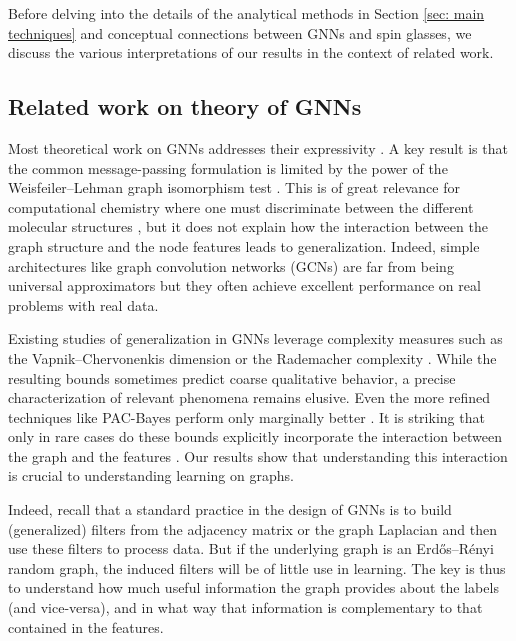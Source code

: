 \documentclass[9pt,twocolumn]{pnas-new}
\begin{document}
Before delving into the details of the analytical methods in Section \ref{sec: main techniques} and conceptual connections between GNNs and spin glasses, we discuss the various interpretations of our results in the context of related work. 


\subsection*{Related work on theory of GNNs}

Most theoretical work on GNNs addresses their expressivity  \cite{sato2020survey,geerts2022expressiveness}. A key result is that the common message-passing formulation is limited by the power of the Weisfeiler--Lehman graph isomorphism test \cite{xu2018how}. This is of great relevance for computational chemistry where one must discriminate between the different molecular structures \cite{gilmer2017neural}, but it does not explain how the interaction between the graph structure and the node features leads to generalization. Indeed, simple architectures like graph convolution networks (GCNs) are far from being universal approximators but they often achieve excellent performance on real problems with real data.

Existing studies of generalization in GNNs leverage complexity measures such as the Vapnik--Chervonenkis dimension \cite{vapnik1971uniform,vapnik1999nature,scarselli2018vapnik} or the Rademacher complexity \cite{garg2020generalization}. While the resulting bounds sometimes predict coarse qualitative behavior, a precise characterization of relevant phenomena remains elusive. Even the more refined techniques like PAC-Bayes perform only marginally better \cite{liao2021a}. It is striking that only in rare cases do these bounds explicitly incorporate the interaction between the graph and the features \cite{esser2021learning}. Our results show that understanding this interaction is crucial to understanding learning on graphs. 

Indeed, recall that a standard practice in the design of GNNs is to build (generalized) filters from the adjacency matrix or the graph Laplacian and then use these filters to process data. But if the underlying graph is an Erdős--Rényi random graph, the induced filters will be of little use in learning. The key is thus to understand how much useful information the graph provides about the labels (and vice-versa), and in what way that information is complementary to that contained in the features.
\end{document}
